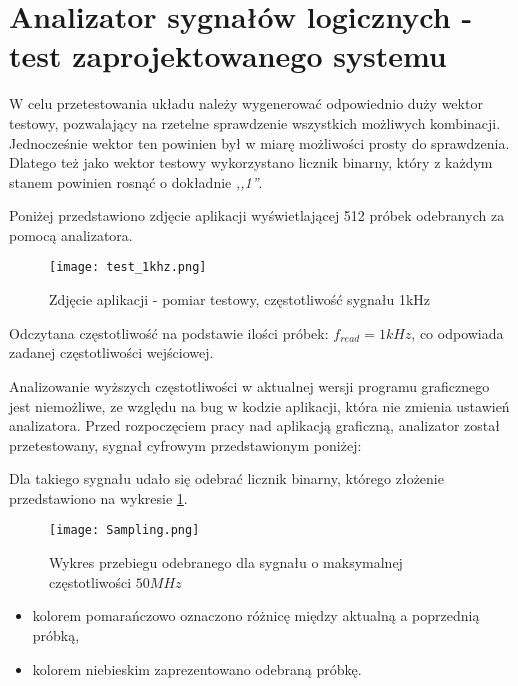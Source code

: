 \section{Analizator sygnałów logicznych - test zaprojektowanego systemu}
    W celu przetestowania układu należy wygenerować odpowiednio duży wektor testowy,
    pozwalający na rzetelne sprawdzenie wszystkich możliwych kombinacji.
    Jednocześnie wektor ten powinien był w miarę możliwości prosty do sprawdzenia.
    Dlatego też jako wektor testowy wykorzystano licznik binarny, który z każdym stanem powinien rosnąć o dokładnie \textit{,,1''}.

    Poniżej przedstawiono zdjęcie aplikacji wyświetlającej 512 próbek odebranych za pomocą analizatora.
    \begin{figure}[!ht]
        \centering
        \texttt{[image: test\_1khz.png]}
        \caption{Zdjęcie aplikacji - pomiar testowy, częstotliwość sygnału 1kHz}
    \end{figure}

    Odczytana częstotliwość na podstawie ilości próbek: $f_{read} = 1kHz$, co odpowiada zadanej częstotliwości wejściowej.

    Analizowanie wyższych częstotliwości w aktualnej wersji programu graficznego jest niemożliwe, ze względu na bug w kodzie aplikacji, która nie zmienia ustawień analizatora.
    Przed rozpoczęciem pracy nad aplikacją graficzną, analizator został przetestowany, sygnał cyfrowym przedstawionym poniżej:
    \begin{figure}[!ht]
        \centering
    \end{figure}

    Dla takiego sygnału udało się odebrać licznik binarny, którego złożenie przedstawiono na wykresie \ref{fig:sampling}.
    \newpage
    \begin{figure}[!ht]
        \centering
        \texttt{[image: Sampling.png]}
        \caption{Wykres przebiegu odebranego dla sygnału o maksymalnej częstotliwości $50MHz$}
        \label{fig:sampling}
    \end{figure}
    \begin{itemize}
        \item kolorem pomarańczowo oznaczono różnicę między aktualną a poprzednią próbką,
        \item kolorem niebieskim zaprezentowano odebraną próbkę.
    \end{itemize}


